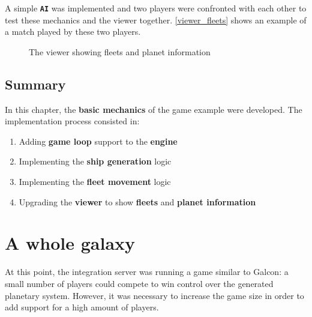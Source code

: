 \documentclass[a4paper,11pt,titlepage,abstract,numbers=noenddot,automark,mnsy,intlimits,rgb,dvipsnames]{report}
\begin{document}
A simple \textbf{\texttt{AI}} was implemented and two players were confronted with each other to test these mechanics and the viewer together.
\autoref{viewer_fleets} shows an example of a match played by these two players.
\begin{figure}[H]
\noindent{}
\caption{The viewer showing fleets and planet information}
\label{viewer_fleets}
\end{figure}
\section{Summary}
In this chapter, the \textbf{basic mechanics} of the game example were developed. The implementation process consisted in:
\begin{enumerate}
\item
Adding \textbf{game loop} support to the \textbf{engine}
\item
Implementing the \textbf{ship generation} logic
\item
Implementing the \textbf{fleet movement} logic
\item
Upgrading the \textbf{viewer} to show \textbf{fleets} and \textbf{planet information}
\end{enumerate}
\chapter{A whole galaxy}
\label{whole_galaxy}
At this point, the integration server was running a game similar to Galcon: a small number of players could
compete to win control over the generated planetary system. However, it was necessary to increase the game size
in order to add support for a high amount of players.
\end{document}
